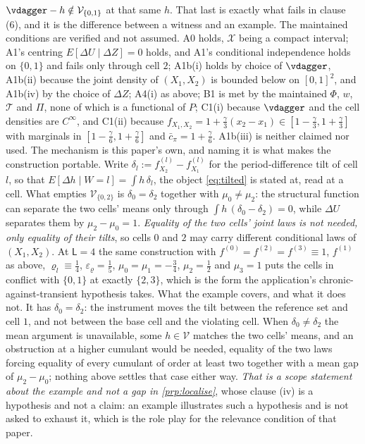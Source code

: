 \begin{remark}
\begin{enumerate}
$\vdagger-h\notin\mathcal V_{\{0,1\}}$ at that same $h$. That last is exactly what fails in clause
\textup{(6)}, and it is the difference between a witness and an example.
The maintained conditions are verified and not assumed. A0 holds, $\mathcal X$ being a compact
interval; A1's centring $E[\Delta U\mid\Delta Z]=0$ holds, and A1's conditional independence holds on
$\{0,1\}$ and fails only through cell $2$; A1b(i) holds by choice of $\vdagger$, A1b(ii) because the
joint density of $(X_1,X_2)$ is bounded below on $[0,1]^{2}$, and A1b(iv) by the choice of $\Delta Z$;
A4(i) as above; B1 is met by the maintained $\Phi$, $w$, $\mathcal T$ and $\Pi$, none of which is a
functional of $P$; C1(i) because $\vdagger$ and the cell densities are $C^{\infty}$, and C1(ii) because
$f_{X_1,X_2}=1+\tfrac{\gamma}{3}(x_2-x_1)\in[1-\tfrac{\gamma}{3},1+\tfrac{\gamma}{3}]$ with marginals in
$[1-\tfrac{\gamma}{6},1+\tfrac{\gamma}{6}]$ and $\bar c_\pi=1+\tfrac{\gamma}{6}$. A1b(iii) is
neither claimed nor used.
The mechanism is this paper's own, and naming it is what makes the construction portable. Write
$\delta_l:=f^{(l)}_{X_2}-f^{(l)}_{X_1}$ for the period-difference tilt of cell $l$, so that
$E[\Delta h\mid W=l]=\int h\,\delta_l$, the object \eqref{eq:tilted} is stated at, read at a cell. What
empties $\mathcal V_{\{0,2\}}$ is $\delta_0=\delta_2$ together with $\mu_0\neq\mu_2$: the structural
function can separate the two cells' means only through $\int h\,(\delta_0-\delta_2)=0$, while
$\Delta U$ separates them by $\mu_2-\mu_0=1$. \emph{Equality of the two cells' joint laws is not needed,
only equality of their tilts}, so cells $0$ and $2$ may carry different conditional laws of $(X_1,X_2)$.
At $\mathsf L=4$ the same construction with $f^{(0)}=f^{(2)}=f^{(3)}\equiv1$, $f^{(1)}$ as above,
$\varrho_l\equiv\tfrac14$, $\varepsilon_\varrho=\tfrac15$, $\mu_0=\mu_1=-\tfrac34$, $\mu_2=\tfrac12$ and
$\mu_3=1$ puts the cells in conflict with $\{0,1\}$ at exactly $\{2,3\}$, which is the form the
application's chronic-against-transient hypothesis takes.
What the example covers, and what it does not. It has $\delta_0=\delta_2$: the instrument moves
the tilt between the reference set and cell $1$, and not between the base cell and the violating cell.
When $\delta_0\neq\delta_2$ the mean argument is unavailable, some $h\in\mathcal V$ matches the two
cells' means, and an obstruction at a higher cumulant would be needed, equality of the two laws
forcing equality of every cumulant of order at least two together with a mean gap of $\mu_2-\mu_0$;
nothing above settles that case either way. \emph{That is a scope statement about the example and not a
gap in \cref{prp:localise}}, whose clause \textup{(iv)} is a hypothesis and not a claim: an example
illustrates such a hypothesis and is not asked to exhaust it, which is the role
\citet[Examples~1 and~2]{centorrinofeveflorens2019} play for the relevance condition of that paper.
\end{enumerate}
\end{remark}

